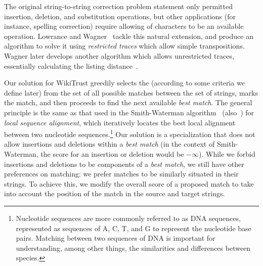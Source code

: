 The original string-to-string correction problem statement
only permitted insertion, deletion, and substitution operations,
but other applications
(for instance, spelling correction) require allowing 
of characters to be an available operation.
Lowrance and Wagner~\cite{Lowrance1975} tackle this natural extension,
and produce an algorithm to solve it using \textit{restricted traces}
which allow simple transpositions.
Wagner later develops another algorithm which allows unrestricted
traces, essentially calculating the listing
distance~\cite{Wagner1975,Sankoff1999}.

Our solution for WikiTrust greedily selects the 
(according to some criteria we define later)
from the set of all possible matches between the set of strings, marks
the match, and then proceeds to find the next available \textit{best match}.
The general principle is the same as that used in the
Smith-Waterman algorithm~\cite{Smith1981} (also~\cite[Ch.~10]{Sankoff1999})
for \textit{local sequence alignment}, which iteratively locates the
best local alignment between two nucleotide
sequences.\footnote{Nucleotide sequences are more commonly referred to
as DNA sequences, represented as sequences of A, C, T, and G to
represent the nucleotide base pairs.  Matching between two sequences of
DNA is important for understanding, among other things, the similarities
and differences between species.}
Our solution is a specialization that does not allow insertions
and deletions within a \textit{best match} (in the context of
Smith-Waterman, the score for an insertion or deletion would be $-\infty$).
While we forbid insertions and deletions to be components of
a \textit{best match}, we still have other preferences on matching:
we prefer matches to be similarly situated in their strings.
To achieve this, we modify the overall score of a proposed match to take
into account the position of the match in the source and target strings.

